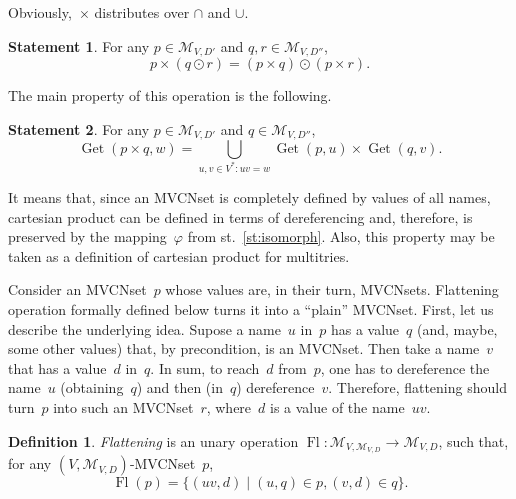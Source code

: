 \documentclass{article}
\theoremstyle{definition}
\newtheorem{Df}{Definition}
\newtheorem{St}{Statement}
\newcommand{\setcharmvcn}{M}
\newcommand{\setsymbol}[3]{\mathcal{#1}_{#2,#3}}
\newcommand{\setmvcn}[2]{\setsymbol{\setcharmvcn}{#1}{#2}}
\newcommand{\flatten}{\operatorname{Fl}}
\newcommand{\deref}{\operatorname{Get}}
\begin{document}
Obviously,~$\times$ distributes over $\cap$ and $\cup$.
\begin{St}\label{st:cartesian-distributivity}
For any $p \in \setmvcn{V}{D'}$ and $q, r \in \setmvcn{V}{D''}$,
\[
  p\times(q\odot r) = (p\times q) \odot (p\times r) .
\]
\end{St}

The main property of this operation is the following.
\begin{St}\label{st:deref-cartesian}
For any $p \in \setmvcn{V}{D'}$ and $q \in \setmvcn{V}{D''}$,
\[
  \deref(p \times q, w) =
      \bigcup_{u,v\in V^\ast: uv = w}
          \deref(p, u)
          \times
          \deref(q, v) .
\]
\end{St}
It means that, since an MVCNset is completely defined by values of all names,
cartesian product can be defined in terms of dereferencing and, therefore,
is preserved by the mapping~$\varphi$ from st.~\ref{st:isomorph}. Also, this
property may be taken as a definition of cartesian product for multitries.

Consider an MVCNset~$p$ whose values are, in their turn, MVCNsets.
Flattening operation formally defined below turns it into a ``plain'' MVCNset.
First, let us describe the underlying idea. Supose a name~$u$ in~$p$ has a
value~$q$ (and, maybe, some other values) that, by precondition, is an
MVCNset.  Then take a name~$v$ that has a value~$d$ in~$q$. In sum, to
reach~$d$ from~$p$, one has to dereference the name~$u$ (obtaining~$q$) and
then (in~$q$) dereference~$v$. Therefore, flattening should turn~$p$ into
such an MVCNset~$r$, where~$d$ is a value of the name~$uv$.
\begin{Df}\label{df:flatten}
\emph{Flattening} is an unary operation
$\flatten : \setmvcn{V}{\setmvcn{V}{D}} \to\setmvcn{V}{D}$,
such that, for any $(V,\setmvcn{V}{D})$-MVCNset~$p$,
\[
  \flatten(p) = \{ (uv, d) \mid (u, q) \in p, (v, d) \in q \} .
\]
\end{Df}
\end{document}
